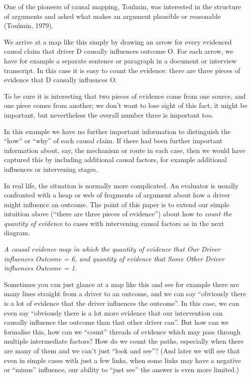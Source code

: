 \documentclass[
]{book}
\begin{document}
One of the pioneers of causal mapping, Toulmin, was interested in the structure of arguments and asked what makes an argument plausible or reasonable (Toulmin, 1979).

We arrive at a map like this simply by drawing an arrow for every evidenced causal claim that driver D causally influences outcome O. For each arrow, we have for example a separate sentence or paragraph in a document or interview transcript. In this case it is easy to count the evidence: there are three pieces of evidence that D causally influences O.

To be sure it is interesting that two pieces of evidence come from one source, and one piece comes from another; we don't want to lose sight of this fact, it might be important, but nevertheless the overall number three is important too.

In this example we have no further important information to distinguish the ``how'' or ``why'' of each causal claim. If there had been further important information about, say, the mechanism or route in each case, then we would have captured this by including additional causal factors, for example additional influences or intervening stages.

In real life, the situation is normally more complicated. An evaluator is usually confronted with a heap or web of fragments of argument about how a driver might influence an outcome. The point of this paper is to extend our simple intuition above (``there are three pieces of evidence'') about how to \emph{count the quantity of evidence} to cases with intervening causal factors as in the next diagram.

\emph{A causal evidence map in which the quantity of evidence that Our Driver influences Outcome = 6, and quantity of evidence that Some Other Driver influences Outcome = 1.}

Sometimes you can just glance at a map like this and see for example there are many lines straight from a driver to an outcome, and we can say ``obviously there is a lot of evidence that the driver influences the outcome''. In this case, we can even say ``obviously there is a lot more evidence that our intervention can causally influence the outcome than that other driver can''. But how can we formalise this, how can we ``count'' threads of evidence which may pass through multiple intermediate factors? How do we count the paths, especially when there are many of them and we can't just ``look and see''? (And later we will see that even in simple cases with just a few links, when some links may have a negative or ``minus'' influence, our ability to ``just see'' the answer is even more limited.)
\end{document}
